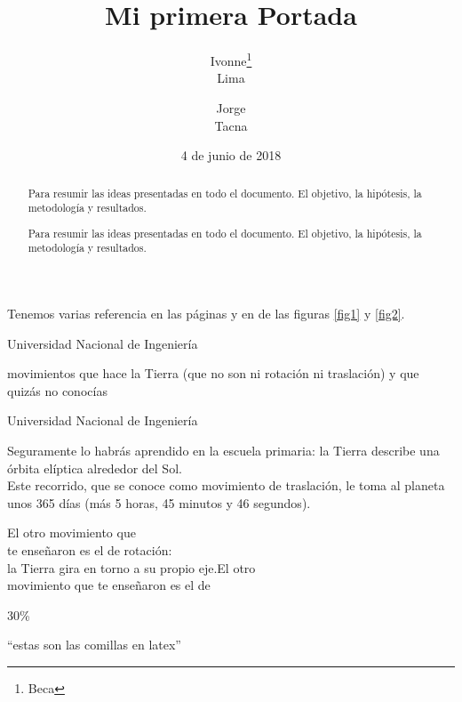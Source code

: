 \documentclass[12pt,a4paper]{article}
\title{Mi primera Portada}
\author{Ivonne\thanks{Beca}\\Lima \and Jorge\\Tacna}
\date{4 de junio de 2018}
\begin{document}
\maketitle	
\thispagestyle{empty} %
\begin{abstract}
Para resumir las ideas presentadas en todo el documento. El objetivo, la hipótesis, la metodología y resultados. 
\end{abstract}

\renewcommand{\spanishabstractname}{Abstract}
\begin{abstract}
	Para resumir las ideas presentadas en todo el documento. El objetivo, la hipótesis, la metodología y resultados.
\end{abstract}

Tenemos varias referencia en las páginas \pageref{fig1} y en \pageref{fig2} de las figuras \ref{fig1} y \ref{fig2}.
	\begin{center}
			Universidad Nacional de Ingeniería
	\end{center}
	
	 movimientos que hace la Tierra (que no son ni rotación ni traslación) y que quizás no conocías \\%
	
	\centerline{Universidad Nacional de Ingeniería}%
	
	Seguramente lo habrás aprendido en la escuela primaria: la Tierra describe una órbita elíptica alrededor del Sol.\\[1cm]%
	
	Este recorrido, que se conoce como movimiento de traslación, le toma al planeta unos 365 días 	(más 5 horas, 45 minutos y 46 segundos).\newline%
	\begin{flushright}
	El otro movimiento que \\te enseñaron es el de rotación: \\la Tierra gira en torno a su propio eje.El otro\\ movimiento que te enseñaron es el de 
	\end{flushright}
	
 30\%
	
	``estas son las comillas en latex''%

\renewcommand{\spanishcontentsname}{Contenido de mi {Indice}}


\tableofcontents
	
\end{document}
